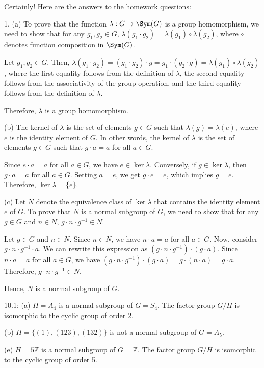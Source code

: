 Certainly! Here are the answers to the homework questions:

1. (a) To prove that the function $\lambda: G \rightarrow \Sym(G)$ is a group homomorphism, we need to show that for any $g_1, g_2 \in G$, $\lambda(g_1 \cdot g_2) = \lambda(g_1) \circ \lambda(g_2)$, where $\circ$ denotes function composition in $\Sym(G)$.

Let $g_1, g_2 \in G$. Then, $\lambda(g_1 \cdot g_2) = (g_1 \cdot g_2) \cdot g = g_1 \cdot (g_2 \cdot g) = \lambda(g_1) \circ \lambda(g_2)$, where the first equality follows from the definition of $\lambda$, the second equality follows from the associativity of the group operation, and the third equality follows from the definition of $\lambda$.

Therefore, $\lambda$ is a group homomorphism.

(b) The kernel of $\lambda$ is the set of elements $g \in G$ such that $\lambda(g) = \lambda(e)$, where $e$ is the identity element of $G$. In other words, the kernel of $\lambda$ is the set of elements $g \in G$ such that $g \cdot a = a$ for all $a \in G$.

Since $e \cdot a = a$ for all $a \in G$, we have $e \in \ker \lambda$. Conversely, if $g \in \ker \lambda$, then $g \cdot a = a$ for all $a \in G$. Setting $a = e$, we get $g \cdot e = e$, which implies $g = e$. Therefore, $\ker \lambda = \{e\}$.

(c) Let $N$ denote the equivalence class of $\ker \lambda$ that contains the identity element $e$ of $G$. To prove that $N$ is a normal subgroup of $G$, we need to show that for any $g \in G$ and $n \in N$, $g \cdot n \cdot g^{-1} \in N$.

Let $g \in G$ and $n \in N$. Since $n \in N$, we have $n \cdot a = a$ for all $a \in G$. Now, consider $g \cdot n \cdot g^{-1} \cdot a$. We can rewrite this expression as $(g \cdot n \cdot g^{-1}) \cdot (g \cdot a)$. Since $n \cdot a = a$ for all $a \in G$, we have $(g \cdot n \cdot g^{-1}) \cdot (g \cdot a) = g \cdot (n \cdot a) = g \cdot a$. Therefore, $g \cdot n \cdot g^{-1} \in N$.

Hence, $N$ is a normal subgroup of $G$.

10.1:
(a) $H = A_4$ is a normal subgroup of $G = S_4$. The factor group $G/H$ is isomorphic to the cyclic group of order 2.

(b) $H = \{(1), (123), (132)\}$ is not a normal subgroup of $G = A_5$.

(e) $H = 5\mathbb{Z}$ is a normal subgroup of $G = \mathbb{Z}$. The factor group $G/H$ is isomorphic to the cyclic group of order 5.

